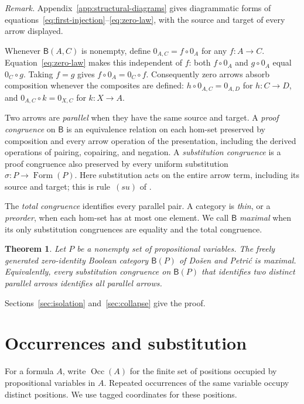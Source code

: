 \documentclass[11pt]{article}
\newtheorem{theorem}{Theorem}[section]
\newcommand{\B}{\mathsf B}
\newcommand{\Occ}{\operatorname{Occ}}
\newcommand{\FormulaSet}{\operatorname{Form}}
\begin{document}
\noindent\textit{Remark.}
Appendix~\ref{app:structural-diagrams} gives diagrammatic forms of
equations~\eqref{eq:first-injection}--\eqref{eq:zero-law}, with the
source and target of every arrow displayed.

Whenever $\B(A,C)$ is nonempty, define $0_{A,C}=f\circ0_A$ for any
$f:A\to C$. Equation~\eqref{eq:zero-law} makes this independent of
$f$: both $f\circ0_A$ and $g\circ0_A$ equal $0_C\circ g$.
Taking $f=g$ gives $f\circ0_A=0_C\circ f$. Consequently zero arrows
absorb composition whenever the composites are defined:
$h\circ0_{A,C}=0_{A,D}$ for $h:C\to D$, and
$0_{A,C}\circ k=0_{X,C}$ for $k:X\to A$.

Two arrows are \emph{parallel} when they have the same source and
target. A \emph{proof congruence} on $\B$ is an equivalence relation
on each hom-set preserved by composition and every arrow operation
of the presentation, including the derived operations of pairing,
copairing, and negation.
A \emph{substitution congruence} is a proof congruence also preserved
by every uniform substitution $\sigma:P\to\FormulaSet(P)$.
Here substitution acts on the entire arrow term, including its source
and target; this is rule~$(su)$ of \cite[\S2.7, p.~51]{DP}.

The \emph{total congruence} identifies every parallel pair. A category
is \emph{thin}, or a \emph{preorder}, when each hom-set has at most one
element. We call $\B$ \emph{maximal} when its only substitution
congruences are equality and the total congruence.

\begin{theorem}\label{thm:main}
Let $P$ be a nonempty set of propositional variables. The freely
generated zero-identity Boolean category $\B(P)$ of Do\v{s}en and
Petri\'c is maximal. Equivalently, every substitution congruence on
$\B(P)$ that identifies two distinct parallel arrows identifies all
parallel arrows.
\end{theorem}

Sections~\ref{sec:isolation} and~\ref{sec:collapse} give the proof.

\section{Occurrences and substitution}\label{sec:occurrences}

For a formula $A$, write $\Occ(A)$ for the finite set of positions
occupied by propositional variables in $A$. Repeated occurrences of the
same variable occupy distinct positions. We use tagged coordinates for
these positions.
\end{document}
